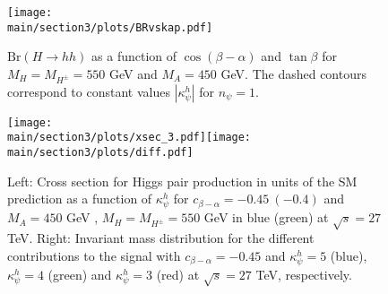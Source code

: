 %
 \begin{figure}
 \begin{center}
 \texttt{[image: \\main/section3/plots/BRvskap.pdf]}
 \caption{\label{fig:BRvskappa} $\text{Br}(H \to hh)$ as a function of $\cos(\beta-\alpha)$ and $ \tan\beta$ for $M_H=M_{H^\pm}=550$ GeV and $M_A=450$ GeV. The dashed contours correspond to constant values $|\kappa_{\psi}^h|$ for $n_{\psi}=1$.}
 \end{center}
  \vspace{-.6cm}
 \end{figure}
%
%
\begin{figure*}
\texttt{[image: \\main/section3/plots/xsec\_3.pdf]}\texttt{[image: \\main/section3/plots/diff.pdf]}
	\caption{\label{fig:xsecc} Left: Cross section for Higgs pair production in units of the SM prediction as a function of $\kappa_{\psi}^h$ for $c_{\beta-\alpha}=-0.45~(-0.4)$ and $M_A=450$ GeV , $M_H=M_{H^\pm}=550$ GeV in blue (green) at $\sqrt{s}=27 $ TeV. Right: Invariant mass distribution for the different contributions to the signal with $c_{\beta-\alpha}=-0.45$ and $\kappa^h_{\psi}=5$ (blue),  $\kappa_{\psi}^h=4$ (green) and $\kappa_{\psi}^h=3$ (red) at $\sqrt{s}=27 $ TeV, respectively.} 
\end{figure*}
%


